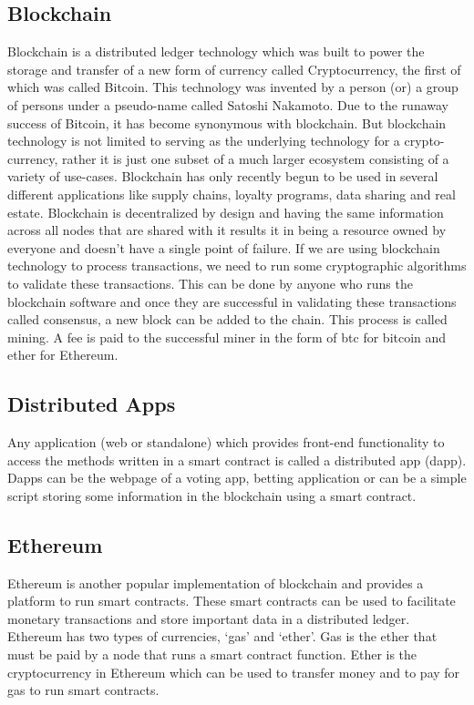 \documentclass[11pt,openright]{report}
\begin{document}
\subsection{Blockchain}
Blockchain is a distributed ledger technology which was built to power the storage and transfer of a new form of currency called Cryptocurrency, the first of which was called Bitcoin. This technology was invented by a person (or) a group of persons under a pseudo-name called Satoshi Nakamoto. Due to the runaway success of Bitcoin, it has become synonymous with blockchain. But blockchain technology is not limited to serving as the underlying technology for a crypto-currency, rather it is just one subset of a much larger ecosystem consisting of a variety of use-cases. Blockchain has only recently begun to be used in several different applications like supply chains, loyalty programs, data sharing and real estate.
Blockchain is decentralized by design and having the same information across all nodes that are shared with it results it in being a resource owned by everyone and doesn’t have a single point of failure. 
If we are using blockchain technology to process transactions, we need to run some cryptographic algorithms to validate these transactions. This can be done by anyone who runs the blockchain software and once they are successful in validating these transactions called consensus, a new block can be added to the chain. This process is called mining. A fee is paid to the successful miner in the form of btc for bitcoin and ether for Ethereum.

\subsection{Distributed Apps}
Any application (web or standalone) which provides front-end functionality to access the methods written in a smart contract is called a distributed app (dapp). Dapps can be the webpage of a voting app, betting application or can be a simple script storing some information in the blockchain using a smart contract.

\subsection{Ethereum}
Ethereum is another popular implementation of blockchain and provides a platform to run smart contracts. These smart contracts can be used to facilitate monetary transactions and store important data in a distributed ledger. Ethereum has two types of currencies, ‘gas’ and ‘ether’. Gas is the ether that must be paid by a node that runs a smart contract function. Ether is the cryptocurrency in Ethereum which can be used to transfer money and to pay for gas to run smart contracts.
\end{document}

